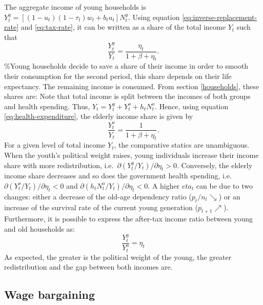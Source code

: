 \documentclass[
]{article}
\begin{document}
The aggregate income of young households is \(Y_t^y = \left[(1-u_t)(1-\tau_t)w_t+b_tu_t\right]N_t^y\). Using equation \eqref{eq:inverse-replacement-rate} and \eqref{eq:tax-rate}, it can be written as a share of the total income \(Y_t\) such that
\begin{equation*}
    \frac{Y_t^y}{Y_t} = \frac{\eta_t}{1+\beta+\eta_t}.
\end{equation*}
\%Young households decide to save a share of their income in order to smooth their consumption for the second period, this share depends on their life expectancy. The remaining income is consumed. From section \ref{households}, these shares are:
Note that total income is split between the incomes of both groups and health spending. Thus, \(Y_t = Y_t^y + Y_t^o + h_tN_t^o\). Hence, using equation \eqref{eq:health-expenditure}, the elderly income share is given by
\begin{equation*}
    \frac{Y_t^o}{Y_t} = \frac{1}{1+\beta+\eta_t}.
\end{equation*}
For a given level of total income \(Y_t\), the comparative statics are unambiguous. When the youth's political weight raises, young individuals increase their income share with more redistribution, i.e.~\(\partial(Y_t^y/Y_t)/\partial\eta_t>0\). Conversely, the elderly income share decreases and so does the government health spending, i.e.~\(\partial (Y_t^o/Y_t)/\partial\eta_t<0\) and \(\partial(h_tN_t^o/Y_t)/\partial\eta_t<0\). A higher \(eta_t\) can be due to two changes: either a decrease of the old-age dependency ratio (\(p_t/n_t \searrow\)) or an increase of the survival rate of the current young generation (\(p_{t+1} \nearrow\)).
Furthermore, it is possible to express the after-tax income ratio between young and old households as:
\begin{equation}
    \frac{Y_t^y}{Y_t^o} = \eta_t \label{eq:after-tax-income-ratio}
\end{equation}
As expected, the greater is the political weight of the young, the greater redistribution and the gap between both incomes are.

\hypertarget{wage-bargaining}{%
\subsection{Wage bargaining}\label{wage-bargaining}}
\end{document}
